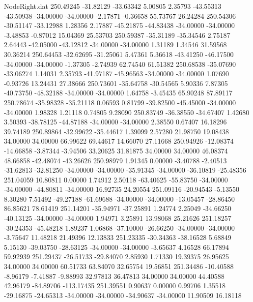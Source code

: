\begin{filecontents}{NodeRight.dat}
 250.49245  -31.82129  -33.63342     5.00805    2.35793  -43.55313  -43.50938  -34.00000  -34.00000   -2.17871   -0.36658   55.73767   26.24284
 250.54306  -30.51147  -33.12988     1.28356    2.17887  -45.21875  -44.83438  -34.00000  -34.00000   -3.48853   -0.87012   15.04369   25.53703
 250.59387  -35.31189  -35.34546     2.75187    2.64443  -42.05000  -43.12812  -34.00000  -34.00000    1.31189    1.34546   31.59568   30.36214
 250.64453  -32.62695  -31.25061     5.47361    5.36618  -43.41250  -46.17500  -34.00000  -34.00000   -1.37305   -2.74939   62.74540   61.51382
 250.68538  -35.07690  -33.06274     1.14031    2.35793  -41.97187  -45.96563  -34.00000  -34.00000    1.07690   -0.93726   13.24431   27.38666
 250.73601  -35.64758  -30.54565     5.90336    7.87305  -40.73750  -48.32188  -34.00000  -34.00000    1.64758   -3.45435   65.90248   87.89117
 250.78674  -35.98328  -35.21118     0.06593    0.81799  -39.82500  -45.45000  -34.00000  -34.00000    1.98328    1.21118    0.74805    9.28090
 250.83749  -36.38550  -34.67407     1.42680    3.50393  -38.78125  -44.87188  -34.00000  -34.00000    2.38550    0.67407   16.18296   39.74189
 250.89864  -32.99622  -35.44617     1.39099    2.57280   21.98750   19.08438   34.00000   34.00000   66.99622   69.44617   14.66070   27.11668
 250.94926  -12.08374  -14.66858    -3.87344   -3.94506   33.20625   31.81875   34.00000   34.00000   46.08374   48.66858  -42.48074  -43.26626
 250.98979    1.91345    0.00000    -3.40788   -2.40513  -31.62813  -32.81250  -34.00000  -34.00000  -35.91345  -34.00000  -36.10819  -25.48356
 251.04059   10.80811    0.00000     1.74912    2.50118  -63.40625  -55.83750  -34.00000  -34.00000  -44.80811  -34.00000   16.92735   24.20554
 251.09116  -20.94543   -5.13550     8.30280    7.51492  -49.27188  -61.69688  -34.00000  -34.00000  -13.05457  -28.86450   86.85621   78.61419
 251.14201  -35.94971  -37.25891     1.24774    2.25049  -34.66250  -40.13125  -34.00000  -34.00000    1.94971    3.25891   13.98068   25.21626
 251.18257  -30.24353  -45.48218     1.89237    1.06868  -37.10000  -26.66250  -34.00000  -34.00000   -3.75647   11.48218   21.49396   12.13833
 251.23335  -30.34363  -38.16528     5.68849    5.15130  -39.03750  -28.63125  -34.00000  -34.00000   -3.65637    4.16528   66.17894   59.92939
 251.29437  -26.51733  -29.84070     2.85930    1.71330   19.39375   26.95625   34.00000   34.00000   60.51733   63.84070   32.65754   19.56851
 251.34486  -10.40588   -8.96179    -7.41887   -9.88993   32.97813   36.47813   34.00000   34.00000   44.40588   42.96179  -84.89706 -113.17435
 251.39551    0.90637    0.00000     0.99706    1.35518  -29.16875  -24.65313  -34.00000  -34.00000  -34.90637  -34.00000   11.90509   16.18118

\end{filecontents}
